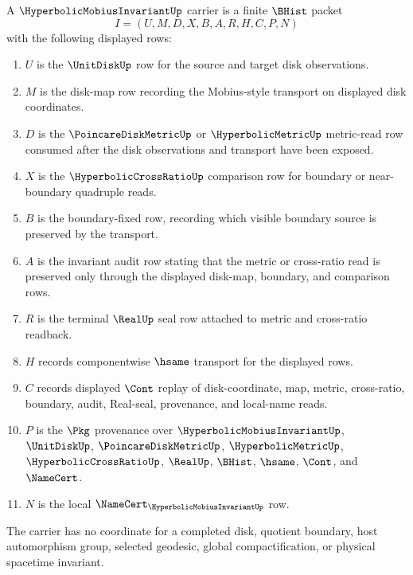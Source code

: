 \begin{definition}
\label{def:hyperbolic-mobius-invariant-carrier}
A $\HyperbolicMobiusInvariantUp$ carrier is a finite $\BHist$ packet
$$
I=(U,M,D,X,B,A,R,H,C,P,N)
$$
with the following displayed rows:
\begin{enumerate}
\item $U$ is the $\UnitDiskUp$ row for the source and target disk observations.
\item $M$ is the disk-map row recording the Mobius-style transport on displayed disk coordinates.
\item $D$ is the $\PoincareDiskMetricUp$ or $\HyperbolicMetricUp$ metric-read row consumed after the disk observations and transport have been exposed.
\item $X$ is the $\HyperbolicCrossRatioUp$ comparison row for boundary or near-boundary quadruple reads.
\item $B$ is the boundary-fixed row, recording which visible boundary source is preserved by the transport.
\item $A$ is the invariant audit row stating that the metric or cross-ratio read is preserved only through the displayed disk-map, boundary, and comparison rows.
\item $R$ is the terminal $\RealUp$ seal row attached to metric and cross-ratio readback.
\item $H$ records componentwise $\hsame$ transport for the displayed rows.
\item $C$ records displayed $\Cont$ replay of disk-coordinate, map, metric, cross-ratio, boundary, audit, Real-seal, provenance, and local-name reads.
\item $P$ is the $\Pkg$ provenance over $\HyperbolicMobiusInvariantUp$, $\UnitDiskUp$, $\PoincareDiskMetricUp$, $\HyperbolicMetricUp$, $\HyperbolicCrossRatioUp$, $\RealUp$, $\BHist$, $\hsame$, $\Cont$, and $\NameCert$.
\item $N$ is the local $\NameCert_{\HyperbolicMobiusInvariantUp}$ row.
\end{enumerate}
The carrier has no coordinate for a completed disk, quotient boundary, host automorphism group, selected geodesic, global compactification, or physical spacetime invariant.
\end{definition}

